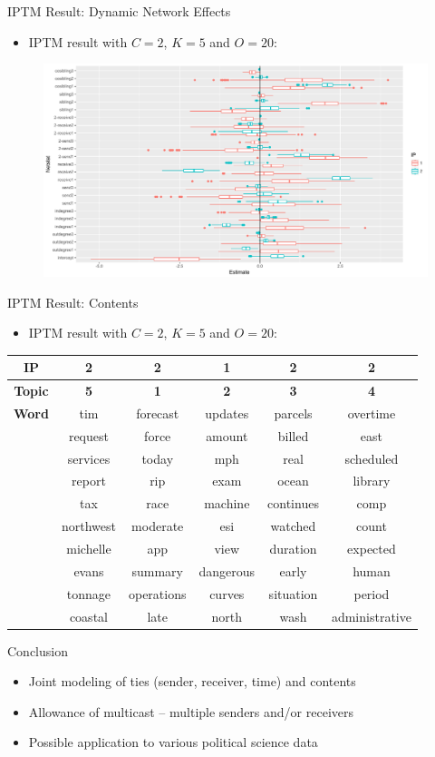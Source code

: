 \documentclass[10pt]{beamer}
\def\bni{\begin{itemize}} \def\ei{\end{itemize}}
\theoremstyle{definition}
\theoremstyle{remark}
\begin{document}
\begin{frame}{IPTM Result: Dynamic Network Effects}
	\bni \item IPTM result with $C=2$, $K=5$ and $O= 20$:
		\ei
  				 		 \begin{figure}
  				 		 	\includegraphics[width=1\textwidth]{figures/DareBplot.pdf}
  				 		 \end{figure}	
  				 		\end{frame}
 \begin{frame}{IPTM Result: Contents}
 	\bni \item IPTM result with $C=2$, $K=5$ and $O= 20$:
 	\ei
\centering	\begin{table}[ht]
	\centering
	\begin{tabular}{ |c|c|c|c|c|c|} 
		\hline
		\textbf{IP} & \textbf{2} &  \textbf{2} & \textbf{1}  &\textbf{2} &\textbf{2}  \\ \hline
			\textbf{Topic} & \textbf{5} &  \textbf{1} & \textbf{2}  &\textbf{3} &\textbf{4}  \\ \hline
			\textbf{Word}& tim & forecast & updates & parcels &overtime\\
			& request& force & amount & billed & east \\
		 & services & today & mph & real & scheduled \\
		   & report & rip & exam & ocean & library\\
		   & tax & race & machine & continues & comp\\
		    &northwest & moderate & esi & watched & count \\
		    & michelle & app  &view & duration & expected \\
		      & evans & summary& dangerous & early & human\\
		 & tonnage & operations & curves & situation & period\\
		 & coastal & late & north & wash & administrative\\
			\hline
	\end{tabular}
\end{table}
\end{frame}

\begin{frame}{Conclusion}
 \bni
 \item Joint modeling of ties (sender, receiver, time) and contents
 	\vspace{0.4cm}
 \item Allowance of multicast -- multiple senders and/or receivers
 	\vspace{0.4cm}
 \item Possible application to various political science data
 \ei
\end{frame}
\end{document}
